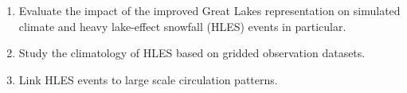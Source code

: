 \documentclass[a0b,landscape]{a0poster}
\begin{document}
\begin{multicols*}{4}

\vspace{0.2cm}
\begin{tcolorbox}[colback=white,colframe=green!40!black,adjusted title={Main objectives}]
  \begin{enumerate}
  \item Evaluate the impact of the improved Great Lakes representation on simulated climate and heavy lake-effect snowfall (HLES) events in particular.
  \item Study the climatology of HLES based on gridded observation datasets.
  \item Link HLES events to large scale circulation patterns.
  \end{enumerate}
\end{tcolorbox}



\end{multicols*}
\end{document}
